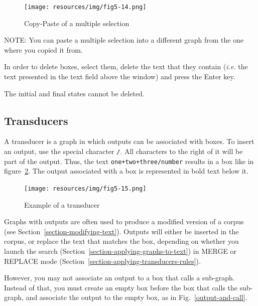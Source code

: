 \begin{figure}[!ht]
\begin{center}
\texttt{[image: resources/img/fig5-14.png]}
\caption{Copy-Paste of a multiple selection\label{copy-paste-multi-selection}}
\end{center}
\end{figure}

\bigskip
\noindent NOTE: You can paste a multiple selection into a different graph from
the one where you copied it from.

\bigskip
{}
\noindent In order to delete boxes, select them, delete the text that they
contain (\textit{i.e.} the text presented in the text field above the window)
and press the Enter key.

\bigskip
\noindent The initial and final states cannot be deleted.

\subsection{Transducers}
\label{Transducers}\index{\verbc{/}}
A transducer is a graph in which outputs can be associated with boxes. To insert
an output, use the special character \verb+/+. All characters to the right of
it will be part of the output. Thus, the text \verb$one+two+three/number$ results in
a box like in figure~\ref{fig-exemple-transduction}. The output associated with a box
is represented in bold text below it.

\begin{figure}[!ht]
\begin{center}
\texttt{[image: resources/img/fig5-15.png]}
\caption{Example of a transducer\label{fig-exemple-transduction}}
\end{center}
\end{figure}


\noindent Graphs with outputs are often used to produce a modified version of a corpus
(see Sec\-tion~\ref{section-modifying-text}). Outputs will either be inserted in the
corpus, or replace the text that matches the box, depending on whether you launch the
search (Section~\ref{section-applying-graphs-to-text}) in MERGE or REPLACE mode
(Section~\ref{section-applying-transducers-rules}).

\bigskip
\noindent However, you may not associate an output to a box that calls a sub-graph.
Instead of that, you must create an empty box before the box that calls the sub-graph,
and associate the output to the empty box, as in Fig.~\ref{output-and-call}.

